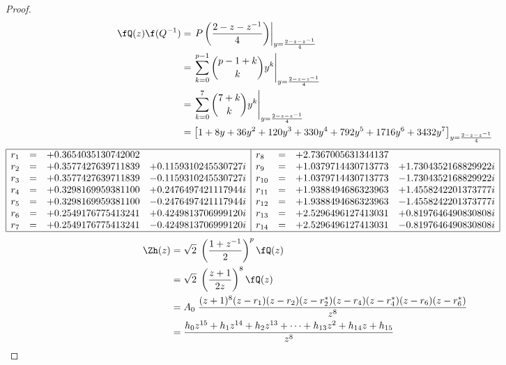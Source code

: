 \begin{proof}
\begin{align*}
   \fQ(z)\f(Q^{-1})
     &= \left.
        P\left( \frac{2-z-z^{-1}}{4} \right)
        \right|_{y=\frac{2-z-z^{-1}}{4}}
   \\&= \left.
        \sum\limits_{k=0}^{p-1} {{p-1+k}\choose{k}} y^k
        \right|_{y=\frac{2-z-z^{-1}}{4}}
   \\&= \left.
        \sum\limits_{k=0}^{7} {{7+k}\choose{k}} y^k
        \right|_{y=\frac{2-z-z^{-1}}{4}}
   \\&= \left[
        1 + 8y + 36y^2 + 120y^3 + 330y^4 + 792y^5 + 1716y^6  + 3432y^7
        \right]_{y=\frac{2-z-z^{-1}}{4}}
\end{align*}
{\footnotesize$\begin{array}{|lcrr|lcrr|}
    \hline
     r_{ 1} &=&  +0.3654035130742002 &                          &  r_{ 8} &=&  +2.7367005631344137  &
  \\ r_{ 2} &=&  +0.3577427639711839 &  +0.1159310245530727 i   &  r_{ 9} &=&  +1.0379714430713773  & +1.7304352168829922 i
  \\ r_{ 3} &=&  +0.3577427639711839 &  -0.1159310245530727 i   &  r_{10} &=&  +1.0379714430713773  & -1.7304352168829922 i
  \\ r_{ 4} &=&  +0.3298169959381100 &  +0.2476497421117944 i   &  r_{11} &=&  +1.9388494686323963  & +1.4558242201373777 i
  \\ r_{ 5} &=&  +0.3298169959381100 &  -0.2476497421117944 i   &  r_{12} &=&  +1.9388494686323963  & -1.4558242201373777 i
  \\ r_{ 6} &=&  +0.2549176775413241 &  +0.4249813706999120 i   &  r_{13} &=&  +2.5296496127413031  & +0.8197646490830808 i
  \\ r_{ 7} &=&  +0.2549176775413241 &  -0.4249813706999120 i   &  r_{14} &=&  +2.5296496127413031  & -0.8197646490830808 i
  \\\hline
\end{array}$}
\begin{align*}
  \Zh(z)
    &= \sqrt{2}\; \left(\frac{1+z^{-1}}{2}\right)^p \fQ(z)
  \\&= \sqrt{2}\; \left(\frac{z+1}{2z}\right)^8 \fQ(z)
  \\&= A_0\;
       \frac{(z+1)^8(z-r_1)(z-r_2)(z-r_2^\ast)(z-r_4)(z-r_4^\ast)(z-r_6)(z-r_6^\ast) }{z^{8}}
  \\&= \frac{h_0z^{15} + h_1z^{14} + h_2z^{13} + \cdots + h_{13}z^2 + h_{14}z + h_{15}}
            {z^{8}}
\end{align*}

\end{proof}
